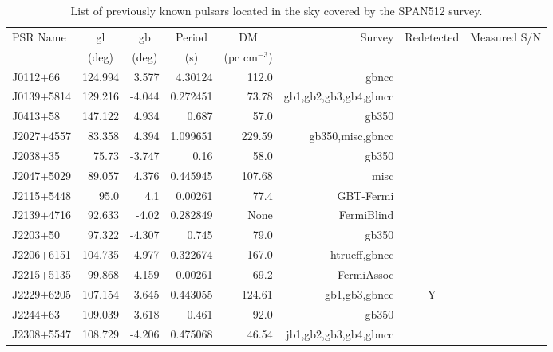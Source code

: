 \begin{table*}
\caption{List of previously known pulsars located in the sky covered by the SPAN512 survey.}
\begin{center}
\begin{tabular}{lrrrrrcr}
\hline
PSR Name & \multicolumn{1}{c}{gl} & \multicolumn{1}{c}{gb} & \multicolumn{1}{c}{Period} & \multicolumn{1}{c}{DM} & Survey & Redetected & Measured S/N\\
         & \multicolumn{1}{c}{(deg)} & \multicolumn{1}{c}{(deg)} & \multicolumn{1}{c}{(s)} & \multicolumn{1}{c}{(pc cm$^{-3}$)} & &  & \\
\hline
J0112$+$66 & 124.994 & 3.577 & 4.30124 & 112.0 & gbncc & & \\
J0139$+$5814 & 129.216 & -4.044 & 0.272451 & 73.78 & gb1,gb2,gb3,gb4,gbncc & & \\
J0413$+$58 & 147.122 & 4.934 & 0.687 & 57.0 & gb350 & & \\
J2027$+$4557 & 83.358 & 4.394 & 1.099651 & 229.59 & gb350,misc,gbncc & & \\
J2038$+$35 & 75.73 & -3.747 & 0.16 & 58.0 & gb350 & & \\
J2047$+$5029 & 89.057 & 4.376 & 0.445945 & 107.68 & misc & & \\
J2115$+$5448 & 95.0 & 4.1 & 0.00261 & 77.4 & GBT-Fermi & & \\
J2139$+$4716 & 92.633 & -4.02 & 0.282849 & None & FermiBlind & & \\
J2203$+$50 & 97.322 & -4.307 & 0.745 & 79.0 & gb350 & & \\
J2206$+$6151 & 104.735 & 4.977 & 0.322674 & 167.0 & htrueff,gbncc & & \\
J2215$+$5135 & 99.868 & -4.159 & 0.00261 & 69.2 & FermiAssoc & & \\
J2229$+$6205 & 107.154 & 3.645 & 0.443055 & 124.61 & gb1,gb3,gbncc & Y & \\
J2244$+$63 & 109.039 & 3.618 & 0.461 & 92.0 & gb350 & & \\
J2308$+$5547 & 108.729 & -4.206 & 0.475068 & 46.54 & jb1,gb2,gb3,gb4,gbncc & & \\
\hline
\end{tabular}%
\label{tab:known-psrs}
\end{center}
\end{table*}

